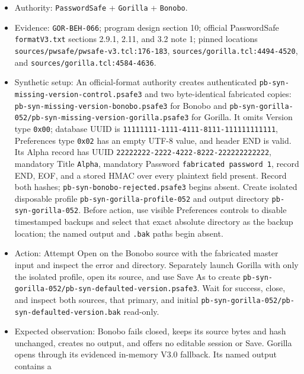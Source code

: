 \documentclass[
  letterpaper,
]{article}
\newcommand{\passthrough}[1]{#1}
\providecommand{\tightlist}{%
  \setlength{\itemsep}{0pt}\setlength{\parskip}{0pt}}
\begin{document}
\begin{itemize}
\tightlist
\item
  Authority: \nolinkurl{PasswordSafe} + \passthrough{\lstinline!Gorilla!} + \passthrough{\lstinline!Bonobo!}.
\item
  Evidence: \nolinkurl{GOR-BEH-066}; program design section 10; official PasswordSafe \nolinkurl{formatV3.txt} sections
  2.9.1, 2.11, and 3.2 note 1; pinned locations \nolinkurl{sources/pwsafe/pwsafe-v3.tcl:176-183},
  \nolinkurl{sources/gorilla.tcl:4494-4520}, and \nolinkurl{sources/gorilla.tcl:4584-4636}.
\item
  Synthetic setup: An official-format authority creates authenticated \nolinkurl{pb-syn-missing-version-control.psafe3}
  and two byte-identical fabricated copies: \nolinkurl{pb-syn-missing-version-bonobo.psafe3} for Bonobo and
  \nolinkurl{pb-syn-gorilla-052/pb-syn-missing-version-gorilla.psafe3} for Gorilla. It omits Version type
  \passthrough{\lstinline!0x00!}; database UUID is \nolinkurl{11111111-1111-4111-8111-111111111111}, Preferences type
  \passthrough{\lstinline!0x02!} has an empty UTF-8 value, and header END is valid. Its Alpha record has UUID
  \nolinkurl{22222222-2222-4222-8222-222222222222}, mandatory Title \passthrough{\lstinline!Alpha!}, mandatory Password
  \passthrough{\lstinline!fabricated password 1!}, record END, EOF, and a stored HMAC over every plaintext field
  present. Record both hashes; \nolinkurl{pb-syn-bonobo-rejected.psafe3} begins absent. Create isolated disposable
  profile \nolinkurl{pb-syn-gorilla-profile-052} and output directory \nolinkurl{pb-syn-gorilla-052}. Before action, use
  visible Preferences controls to disable timestamped backups and select that exact absolute directory as the backup
  location; the named output and \passthrough{\lstinline!.bak!} paths begin absent.
\item
  Action: Attempt Open on the Bonobo source with the fabricated master input and inspect the error and directory.
  Separately launch Gorilla with only the isolated profile, open its source, and use Save As to create
  \nolinkurl{pb-syn-gorilla-052/pb-syn-defaulted-version.psafe3}. Wait for success, close, and inspect both sources,
  that primary, and initial \nolinkurl{pb-syn-gorilla-052/pb-syn-defaulted-version.bak} read-only.
\item
  Expected observation: Bonobo fails closed, keeps its source bytes and hash unchanged, creates no output, and offers no
  editable session or Save. Gorilla opens through its evidenced in-memory V3.0 fallback. Its named output contains a

\end{itemize}
\end{document}

